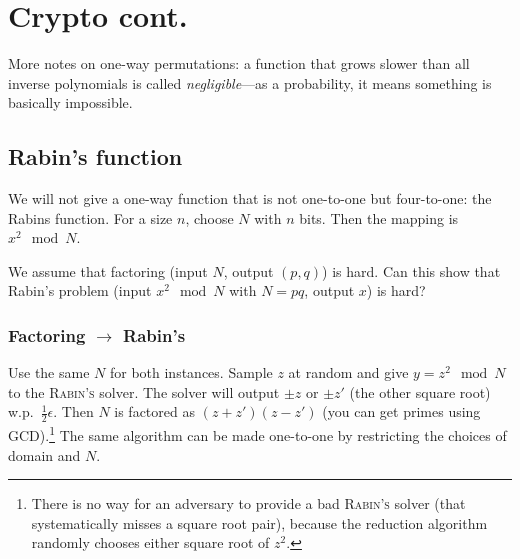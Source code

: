 \chapter{Crypto cont.}
More notes on one-way permutations: a function that grows slower than all inverse polynomials is called \emph{negligible}---as a probability, it means something is basically impossible.

\section{Rabin's function}
We will not give a one-way function that is not one-to-one but four-to-one: the Rabins function.
For a size \(n\), choose \(N\) with \(n\) bits. Then the mapping is \(x^2 \mod N\).

We assume that factoring (input \(N\), output \((p, q)\)) is hard. Can this show that Rabin's problem (input \(x^2 \mod N\) with \(N = pq\), output \(x\)) is hard?

\subsection{{Factoring} \(\to\) {Rabin's}}
Use the same \(N\) for both instances. Sample \(z\) at random and give \(y =  z^2\mod N\) to the \textsc{Rabin's} solver.
The solver will output \(\pm z\) or \(\pm z'\) (the other square root) w.p.~\(\frac{1}{2}\epsilon\).
Then \(N\) is factored as \(\left(z + z'\right)\left(z - z'\right)\) (you can get primes using GCD).\footnote{There is no way for an adversary to provide a bad \textsc{Rabin's} solver (that systematically misses a square root pair), because the reduction algorithm randomly chooses either square root of \(z^2\).} The same algorithm can be made one-to-one by restricting the choices of domain and \(N\).

